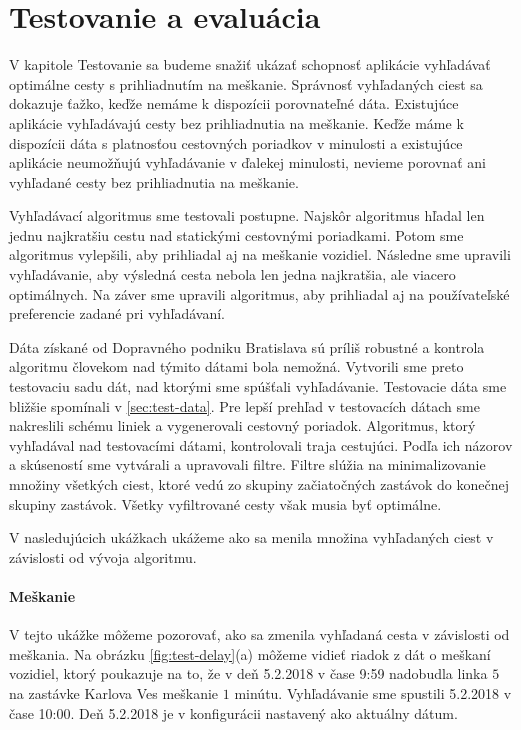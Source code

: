  \chapter{Testovanie a evaluácia}
\label{kap:tes}

V kapitole Testovanie sa budeme snažiť ukázať schopnosť aplikácie vyhľadávať optimálne cesty s prihliadnutím na meškanie. Správnosť vyhľadaných ciest sa dokazuje ťažko, keďže nemáme k dispozícii porovnateľné dáta. Existujúce aplikácie vyhľadávajú cesty bez prihliadnutia na meškanie. Keďže máme k dispozícii dáta s platnosťou cestovných poriadkov v minulosti a existujúce aplikácie neumožňujú vyhľadávanie v ďalekej minulosti, nevieme porovnať ani vyhľadané cesty bez prihliadnutia na meškanie. 

Vyhľadávací algoritmus sme testovali postupne. Najskôr algoritmus hľadal len jednu najkratšiu cestu nad statickými cestovnými poriadkami. Potom sme algoritmus vylepšili, aby prihliadal aj na meškanie vozidiel. Následne sme upravili vyhľadávanie, aby výsledná cesta nebola len jedna najkratšia, ale viacero optimálnych. Na záver sme upravili algoritmus, aby prihliadal aj na používateľské preferencie zadané pri vyhľadávaní.

Dáta získané od Dopravného podniku Bratislava sú príliš robustné a kontrola algoritmu človekom nad týmito dátami bola nemožná. Vytvorili sme preto testovaciu sadu dát, nad ktorými sme spúšťali vyhľadávanie. Testovacie dáta sme bližšie spomínali v \ref{sec:test-data}. Pre lepší prehľad v testovacích dátach sme nakreslili schému liniek a vygenerovali cestovný poriadok. Algoritmus, ktorý vyhľadával nad testovacími dátami, kontrolovali traja cestujúci. Podľa ich názorov a skúseností sme vytvárali a upravovali filtre. Filtre slúžia na minimalizovanie množiny všetkých ciest, ktoré vedú zo skupiny začiatočných zastávok do konečnej skupiny zastávok. Všetky vyfiltrované cesty však musia byť optimálne.

V nasledujúcich ukážkach ukážeme ako sa menila množina vyhľadaných ciest v závislosti od vývoja algoritmu.

\subsubsection{Meškanie}
V tejto ukážke môžeme pozorovať, ako sa zmenila vyhľadaná cesta v závislosti od meškania. Na obrázku \ref{fig:test-delay}(a) môžeme vidieť riadok z dát o meškaní vozidiel, ktorý poukazuje na to, že v deň 5.2.2018 v čase 9:59 nadobudla linka $5$ na zastávke Karlova Ves meškanie $1$ minútu. Vyhľadávanie sme spustili 5.2.2018 v čase 10:00. Deň 5.2.2018 je v konfigurácii nastavený ako aktuálny dátum. 

